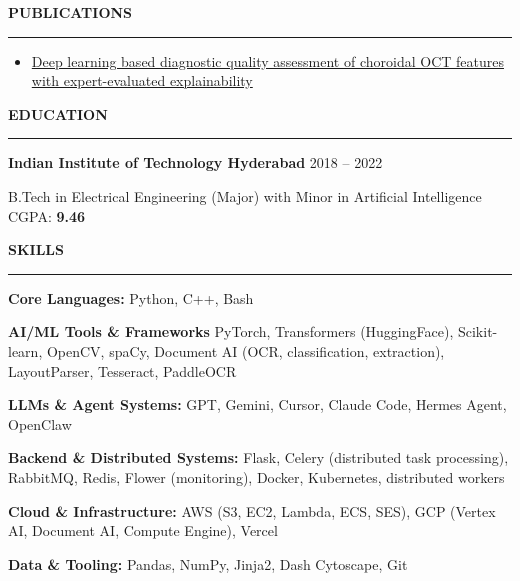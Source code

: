 \documentclass[10pt]{article}
\newcommand{\resumeSection}[1]{%
  \vspace{4pt plus 6pt}%
  \textbf{#1}\par
  \vspace{-5pt}%
  \rule{\linewidth}{0.3pt}\par
  \vspace{0pt}%
}
\newcommand{\resumeSubline}[1]{%
  #1\par
}
\newcommand{\kw}[1]{\textbf{#1}}
\begin{document}
\resumeSection{PUBLICATIONS}

\begin{itemize}
  \item \href{https://www.researchgate.net/publication/367500474\_Deep\_learning\_based\_diagnostic\_quality\_assessment\_of\_choroidal\_OCT\_features\_with\_expert-evaluated\_explainability}{Deep learning based diagnostic quality assessment of choroidal OCT features with expert-evaluated explainability}
\end{itemize}

\resumeSection{EDUCATION}

\resumeSubline{\textbf{Indian Institute of Technology Hyderabad} \hfill 2018 -- 2022}
\resumeSubline{B.Tech in Electrical Engineering (Major) with Minor in Artificial Intelligence \hfill CGPA: \kw{9.46}}


\resumeSection{SKILLS}

\resumeSubline{\textbf{Core Languages:} Python, C++, Bash}
\resumeSubline{\textbf{AI/ML Tools \& Frameworks} PyTorch, Transformers (HuggingFace), Scikit-learn, OpenCV, spaCy, Document AI (OCR, classification, extraction), LayoutParser, Tesseract, PaddleOCR}
\resumeSubline{\textbf{LLMs \& Agent Systems:} GPT, Gemini, Cursor, Claude Code, Hermes Agent, OpenClaw}
\resumeSubline{\textbf{Backend \& Distributed Systems:} Flask, Celery (distributed task processing), RabbitMQ, Redis, Flower (monitoring), Docker, Kubernetes, distributed workers}
\resumeSubline{\textbf{Cloud \& Infrastructure:} AWS (S3, EC2, Lambda, ECS, SES), GCP (Vertex AI, Document AI, Compute Engine), Vercel}
\resumeSubline{\textbf{Data \& Tooling:} Pandas, NumPy, Jinja2, Dash Cytoscape, Git}
\end{document}
